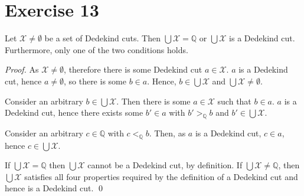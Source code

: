 \documentclass[11pt]{llncs}
\begin{document}
\section*{Exercise 13}
\begin{lemma}\label{lem:dedekind-union}
  Let $\mathcal{X} \neq \emptyset$ be a set of Dedekind cuts.
  Then $\bigcup\mathcal{X} = \mathbb{Q}$ or $\bigcup\mathcal{X}$ is a Dedekind
  cut. Furthermore, only one of the two conditions holds.
\end{lemma}
\begin{proof}
  As $\mathcal{X} \neq \emptyset$, therefore there is some Dedekind cut
  $a \in \mathcal{X}$. $a$ is a Dedekind cut, hence $a \neq \emptyset$, so
  there is some $b \in a$. Hence, $b \in \bigcup\mathcal{X}$ and
  $\bigcup\mathcal{X} \neq \emptyset$.

  Consider an arbitrary $b \in \bigcup\mathcal{X}$. Then there is some
  $a \in \mathcal{X}$ such that $b \in a$. $a$ is a Dedekind cut, hence
  there exists some $b' \in a$ with $b' >_\mathbb{Q} b$ and
  $b' \in \bigcup\mathcal{X}$.

  Consider an arbitrary $c \in \mathbb{Q}$ with $c <_\mathbb{Q} b$. Then, as $a$
  is a Dedekind cut, $c \in a$, hence $c \in \bigcup\mathcal{X}$.

  If $\bigcup\mathcal{X} = \mathbb{Q}$ then $\bigcup\mathcal{X}$ cannot be a
  Dedekind cut, by definition. If $\bigcup\mathcal{X} \neq \mathbb{Q}$, then
  $\bigcup\mathcal{X}$ satisfies all four properties required by the definition
  of a Dedekind cut and hence is a Dedekind cut.
  \qed
\end{proof}
\end{document}
